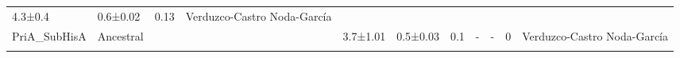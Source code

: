 \documentclass[12pt,twoside]{reedthesis}
\begin{document}
\begin{longtable}[]{@{}lllllllllll@{}}
\begin{minipage}[t]{0.05\columnwidth}
  4.3±0.4\strut
  \end{minipage} & \begin{minipage}[t]{0.05\columnwidth}\raggedright\strut
  0.6±0.02\strut
  \end{minipage} & \begin{minipage}[t]{0.03\columnwidth}\raggedright\strut
  0.13\strut
  \end{minipage} & \begin{minipage}[t]{0.11\columnwidth}\raggedright\strut
  Verduzco-Castro Noda-García\strut
  \end{minipage}\tabularnewline
  \begin{minipage}[t]{0.15\columnwidth}\raggedright\strut
  PriA\_SubHisA\strut
  \end{minipage} & \begin{minipage}[t]{0.05\columnwidth}\raggedright\strut
  Ancestral\strut
  \end{minipage} & \begin{minipage}[t]{0.04\columnwidth}\raggedright\strut
  \strut
  \end{minipage} & \begin{minipage}[t]{0.04\columnwidth}\raggedright\strut
  \strut
  \end{minipage} & \begin{minipage}[t]{0.06\columnwidth}\raggedright\strut
  3.7±1.01\strut
  \end{minipage} & \begin{minipage}[t]{0.06\columnwidth}\raggedright\strut
  0.5±0.03\strut
  \end{minipage} & \begin{minipage}[t]{0.06\columnwidth}\raggedright\strut
  0.1\strut
  \end{minipage} & \begin{minipage}[t]{0.05\columnwidth}\raggedright\strut
  -\strut
  \end{minipage} & \begin{minipage}[t]{0.05\columnwidth}\raggedright\strut
  -\strut
  \end{minipage} & \begin{minipage}[t]{0.03\columnwidth}\raggedright\strut
  0\strut
  \end{minipage} & \begin{minipage}[t]{0.11\columnwidth}\raggedright\strut
  Verduzco-Castro Noda-García\strut
  \end{minipage}\tabularnewline
  \begin{minipage}[t]{0.15\columnwidth}\raggedright\strut

\end{minipage}
\end{longtable}
\end{document}
